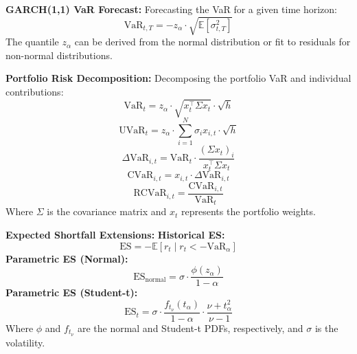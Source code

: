 \documentclass[12pt]{article}
\begin{document}
\vspace{0.5cm}

\textbf{GARCH(1,1) VaR Forecast:}  
Forecasting the VaR for a given time horizon:
\[
\text{VaR}_{t,T} = - z_\alpha \cdot \sqrt{\mathbb{E}[\sigma_{t,T}^2]}
\]
The quantile \(z_\alpha\) can be derived from the normal distribution or fit to residuals for non-normal distributions.

\vspace{0.5cm}

\textbf{Portfolio Risk Decomposition:}  
Decomposing the portfolio VaR and individual contributions:
\[
\text{VaR}_t = z_\alpha \cdot \sqrt{x_t^\top \Sigma x_t} \cdot \sqrt{h}
\]
\[
\text{UVaR}_t = z_\alpha \cdot \sum_{i=1}^N \sigma_i x_{i,t} \cdot \sqrt{h}
\]
\[
\Delta \text{VaR}_{i,t} = \text{VaR}_t \cdot \frac{(\Sigma x_t)_i}{x_t^\top \Sigma x_t}
\]
\[
\text{CVaR}_{i,t} = x_{i,t} \cdot \Delta \text{VaR}_{i,t}
\]
\[
\text{RCVaR}_{i,t} = \frac{\text{CVaR}_{i,t}}{\text{VaR}_t}
\]
Where \( \Sigma \) is the covariance matrix and \(x_t\) represents the portfolio weights.

\vspace{0.5cm}

\textbf{Expected Shortfall Extensions:}  
\textbf{Historical ES:}
\[
\text{ES} = -\mathbb{E}[r_t \mid r_t < -\text{VaR}_\alpha]
\]
\textbf{Parametric ES (Normal):}
\[
\text{ES}_{\text{normal}} = \sigma \cdot \frac{\phi(z_\alpha)}{1 - \alpha}
\]
\textbf{Parametric ES (Student-t):}
\[
\text{ES}_t = \sigma \cdot \frac{f_{t_\nu}(t_\alpha)}{1 - \alpha} \cdot \frac{\nu + t_\alpha^2}{\nu - 1}
\]
Where \(\phi\) and \(f_{t_\nu}\) are the normal and Student-t PDFs, respectively, and \(\sigma\) is the volatility.
\end{document}
